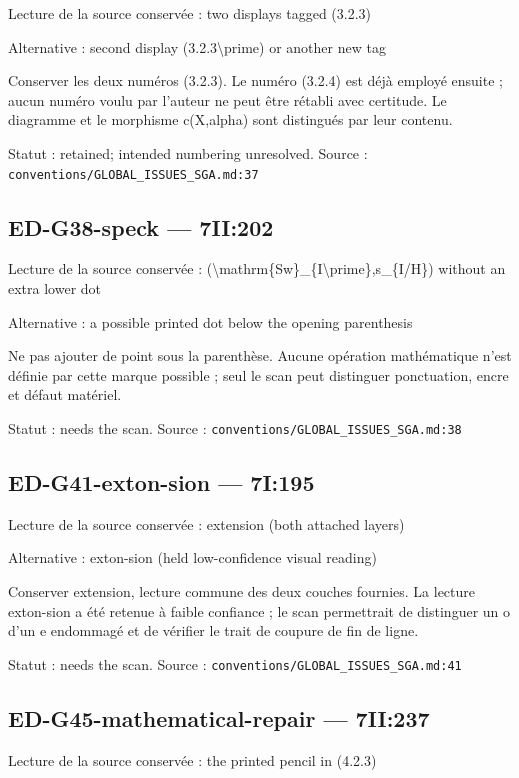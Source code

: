 Lecture de la source conservée : two displays tagged (3.2.3)

Alternative : second display (3.2.3\textbackslash{}prime) or another new tag

Conserver les deux numéros (3.2.3). Le numéro (3.2.4) est déjà employé ensuite ; aucun numéro voulu par l’auteur ne peut être rétabli avec certitude. Le diagramme et le morphisme c(X,alpha) sont distingués par leur contenu.

Statut : retained; intended numbering unresolved. Source : \nolinkurl{conventions/GLOBAL_ISSUES_SGA.md:37}

\subsection*{ED-G38-speck — 7II:202}

Lecture de la source conservée : (\textbackslash{}mathrm\{Sw\}\_\{I\textbackslash{}prime\},s\_\{I/H\}) without an extra lower dot

Alternative : a possible printed dot below the opening parenthesis

Ne pas ajouter de point sous la parenthèse. Aucune opération mathématique n’est définie par cette marque possible ; seul le scan peut distinguer ponctuation, encre et défaut matériel.

Statut : needs the scan. Source : \nolinkurl{conventions/GLOBAL_ISSUES_SGA.md:38}

\subsection*{ED-G41-exton-sion — 7I:195}

Lecture de la source conservée : extension (both attached layers)

Alternative : exton-sion (held low-confidence visual reading)

Conserver extension, lecture commune des deux couches fournies. La lecture exton-sion a été retenue à faible confiance ; le scan permettrait de distinguer un o d’un e endommagé et de vérifier le trait de coupure de fin de ligne.

Statut : needs the scan. Source : \nolinkurl{conventions/GLOBAL_ISSUES_SGA.md:41}

\subsection*{ED-G45-mathematical-repair — 7II:237}

Lecture de la source conservée : the printed pencil in (4.2.3)

